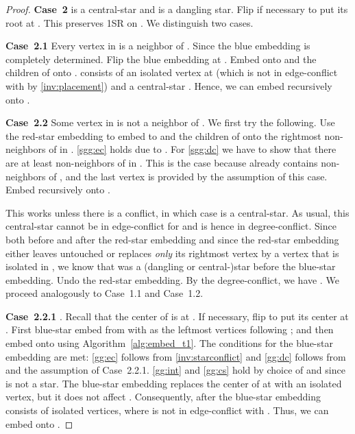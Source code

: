 \documentclass[11pt,a4paper,colorlinks=true,urlcolor=blue,citecolor=red]{article}
\theoremstyle{plain}
\newcommand{\case}[1]{\par\vspace{.5\baselineskip}\noindent\textbf{\sffamily Case~#1}}
\begin{document}
\begin{proof}
  \case{2}  is a central-star and  is a dangling star.
  Flip  if necessary to put its root at . This preserves
  1SR on . We distinguish two cases.

  \case{2.1} Every vertex in  is a neighbor of .
  Since  the blue embedding is completely
  determined. Flip the blue embedding at . Embed  onto
   and the children of  onto . 
  consists of an isolated vertex at  (which is not in edge-conflict
  with  by \ref{inv:placement}) and a central-star .
  Hence, we can embed  recursively onto .

  \case{2.2} Some vertex in  is not a neighbor of .
  We first try the following. Use the red-star embedding to embed  to
   and the children of  onto the rightmost 
  non-neighbors of  in . \ref{sgg:ec} holds due to
  . For \ref{sgg:dc} we have to show that there are
  at least  non-neighbors of  in . This is the
  case because  already contains 
  non-neighbors of , and the last vertex is provided by the
  assumption of this case. Embed  recursively onto .

  This works unless there is a conflict, in which case
   is a central-star. As usual, this
  central-star cannot be in edge-conflict for  and is hence in
  degree-conflict. Since  both before
  and after the red-star embedding and since the
  red-star embedding either leaves  untouched or
  replaces \emph{only} its rightmost vertex by a vertex that is isolated
  in , we know that  was a (dangling or
  central-)star before the blue-star embedding. Undo the
  red-star embedding. By the degree-conflict, we have
  . We proceed analogously to
  Case~1.1 and Case~1.2.

  \case{2.2.1} . Recall that the
  center of  is at . If necessary, flip  to
  put its center at . First blue-star embed  from  with
   as the  leftmost vertices following
  ; and then embed  onto  using
  Algorithm~\ref{alg:embed_t1}. The conditions for the blue-star
  embedding are met: \ref{gg:ec} follows from \ref{inv:starconflict} and
  \ref{gg:dc} follows from  and
  the assumption of Case~2.2.1. \ref{gg:int} and \ref{gg:cs} hold by
  choice of  and since  is not a star. The blue-star
  embedding replaces the center of  at  with an
  isolated vertex, but it does not affect . Consequently, after the
  blue-star embedding  consists of  isolated
  vertices, where  is not in edge-conflict with . Thus, we can
  embed  onto .


\end{proof}
\end{document}
